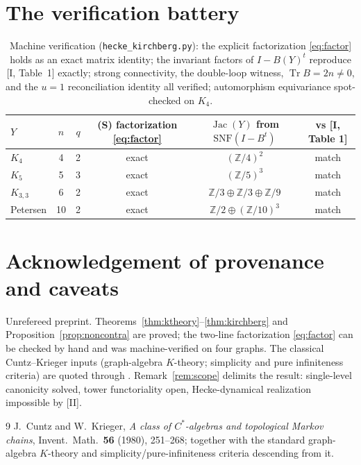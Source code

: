 \documentclass[11pt]{amsart}
\numberwithin{equation}{section}
\theoremstyle{definition}
\theoremstyle{remark}
\newcommand{\Z}{\mathbb{Z}}
\newcommand{\Jac}{\operatorname{Jac}}
\newcommand{\Tr}{\operatorname{Tr}}
\begin{document}
\section{The verification battery}\label{sec:battery}

\begin{table}[ht]
\centering\small
\renewcommand{\arraystretch}{1.2}
\begin{tabular}{lccccc}
\toprule
$Y$ & $n$ & $q$ & (S) factorization \eqref{eq:factor} & $\Jac(Y)$ from
$\mathrm{SNF}(I-B^t)$ & vs [I, Table 1]\\
\midrule
$K_4$      & 4  & 2 & exact & $(\Z/4)^2$                 & match\\
$K_5$      & 5  & 3 & exact & $(\Z/5)^3$                 & match\\
$K_{3,3}$  & 6  & 2 & exact & $\Z/3\oplus\Z/3\oplus\Z/9$ & match\\
Petersen   & 10 & 2 & exact & $\Z/2\oplus(\Z/10)^3$      & match\\
\bottomrule
\end{tabular}
\medskip
\caption{Machine verification (\texttt{hecke\_kirchberg.py}): the explicit
factorization \eqref{eq:factor} holds as an exact matrix identity; the invariant
factors of $I-B(Y)^t$ reproduce [I, Table~1] exactly; strong connectivity, the
double-loop witness, $\Tr B=2n\neq0$, and the $u{=}1$ reconciliation identity all
verified; automorphism equivariance spot-checked on $K_4$.}
\label{tab:battery}
\end{table}

\section*{Acknowledgement of provenance and caveats}

Unrefereed preprint. Theorems~\ref{thm:ktheory}--\ref{thm:kirchberg} and
Proposition~\ref{prop:noncontra} are proved; the two-line factorization
\eqref{eq:factor} can be checked by hand and was machine-verified on four graphs.
The classical Cuntz--Krieger inputs (graph-algebra $K$-theory; simplicity and pure
infiniteness criteria) are quoted through \cite{CK}. Remark~\ref{rem:scope} delimits the result: single-level canonicity
solved, tower functoriality open, Hecke-dynamical realization impossible by [II].

\begin{thebibliography}{9}
 J.~Cuntz and W.~Krieger, \emph{A class of $C^*$-algebras and
topological Markov chains}, Invent.\ Math.\ \textbf{56} (1980), 251--268; together
with the standard graph-algebra $K$-theory and simplicity/pure-infiniteness
criteria descending from it.
\end{thebibliography}
\end{document}
